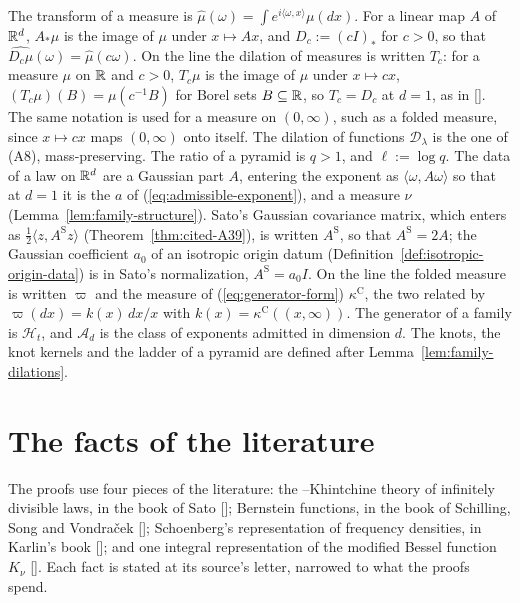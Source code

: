 The transform of a measure is $\widehat\mu(\omega) = \int e^{i\langle\omega, x\rangle}\mu(dx)$. For
a linear map $A$ of $\mathbb{R}^d$, $A_*\mu$ is the image of $\mu$ under $x \mapsto Ax$, and
$D_c := (cI)_*$ for $c > 0$, so that $\widehat{D_c\mu}(\omega) = \widehat\mu(c\omega)$. On the line
the dilation of measures is written $T_c$: for a measure $\mu$ on $\mathbb{R}$ and $c > 0$, $T_c\mu$ is the
image of $\mu$ under $x \mapsto cx$, $(T_c\mu)(B) = \mu(c^{-1}B)$ for Borel sets $B \subseteq \mathbb{R}$,
so $T_c = D_c$ at $d = 1$, as in []. The same notation is used for a measure on
$(0,\infty)$, such as a folded \Levy{} measure, since $x \mapsto cx$ maps $(0,\infty)$ onto itself.
The dilation of functions $\mathcal{D}_\lambda$ is the one of
(A8), mass-preserving. The ratio of a pyramid is $q > 1$, and $\ell := \log q$. The \Levy{} data of
a law on $\mathbb{R}^d$ are a Gaussian part $A$, entering the exponent as $\langle\omega, A\omega\rangle$
so that at $d = 1$ it is the $a$ of (\ref{eq:admissible-exponent}), and a \Levy{} measure $\nu$
(Lemma~\ref{lem:family-structure}). Sato's Gaussian covariance matrix, which enters as
$\tfrac12\langle z, A^{\mathrm S}z\rangle$ (Theorem~\ref{thm:cited-A39}), is written $A^{\mathrm S}$,
so that $A^{\mathrm S} = 2A$; the Gaussian coefficient $a_0$ of an isotropic origin datum
(Definition~\ref{def:isotropic-origin-data}) is in Sato's normalization, $A^{\mathrm S} = a_0I$. On
the line the folded \Levy{} measure is written $\varpi$
and the measure of (\ref{eq:generator-form}) $\kappa^{\mathrm C}$, the two related by
$\varpi(dx) = k(x)\,dx/x$ with $k(x) = \kappa^{\mathrm C}((x,\infty))$. The generator of a family
is $\mathcal{H}_t$, and $\mathcal{A}_d$ is the class of exponents admitted in dimension $d$. The
knots, the knot kernels and the ladder of a pyramid are defined after
Lemma~\ref{lem:family-dilations}.

\section{The facts of the literature}
\label{sec:cited-literature}

The proofs use four pieces of the literature: the \Levy--Khintchine theory of infinitely divisible
laws, in the book of Sato []; Bernstein functions, in the book of Schilling, Song
and Vondra\v{c}ek []; Schoenberg's representation of \Polya{} frequency
densities, in Karlin's book []; and one integral representation of the
modified Bessel function $K_\nu$ []. Each fact is stated at its source's letter,
narrowed to what the proofs spend.

